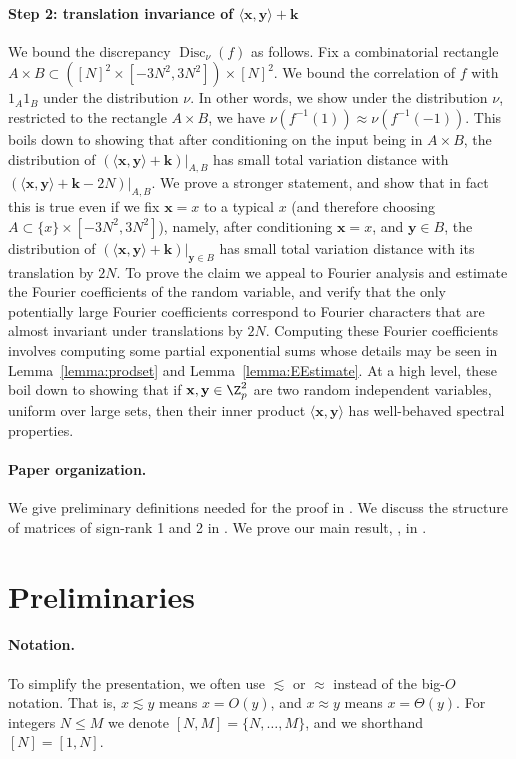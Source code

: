 \documentclass{toc}
\DeclareMathOperator{\Disc}{Disc}
\newcommand{\x}{\mathbf{x}}
\newcommand{\y}{\mathbf{y}}
\newcommand{\Bk}{\mathbf{k}}   %
\newcommand{\ip}[1]{\langle #1 \rangle}
\begin{document}
\paragraph{Step 2: translation invariance of $\langle \x,\y\rangle+\Bk$}
We bound the discrepancy $\Disc_\nu(f)$ as follows. Fix a combinatorial rectangle $A\times B\subset ([N]^2\times [-3N^2,3N^2]) \times [N]^2$. We bound the correlation of $f$ with $1_A1_B$ under the distribution $\nu$. In other words, we show under the distribution $\nu$, restricted to the rectangle $A\times B$, we have $\nu(f^{-1}(1)) \approx \nu(f^{-1}(-1)) $.  This boils down to showing that after conditioning on the input being in $A\times B$, the distribution of $(\ip{\x,\y}+\Bk)|_{A,B}$ has small total variation distance with $(\ip{\x,\y}+\Bk-2N)|_{A,B}$. We prove a stronger  statement, and show that in fact this is true even if we fix $\x=x$ to a typical $x$ (and therefore choosing $A\subset \{x\}\times [-3N^2,3N^2]$), namely, after conditioning $\x=x$, and $\y\in B$, the distribution of $(\ip{\x,\y}+\Bk)|_{\y \in B}$  has small total variation distance with its translation by $2N$. To prove the claim  we appeal to  Fourier analysis and estimate the Fourier coefficients of the random variable, and verify that  the only potentially large Fourier coefficients correspond to Fourier characters that are almost invariant under translations by $2N$. Computing these Fourier coefficients involves computing some partial exponential sums whose details may be seen in Lemma~\ref{lemma:prodset} and Lemma~\ref{lemma:EEstimate}. At a high level, these boil down to showing that if $\x,\y \in \Z_p^2$ are two random independent variables, uniform over large sets, then their inner product $\ip{\x,\y}$ has well-behaved spectral properties.


\paragraph{Paper organization.}
We give preliminary definitions needed for the proof in .
We discuss the structure of matrices of sign-rank 1 and 2 in .
We prove our main result, , in .


\section{Preliminaries}
\label{sec:prelim}

%
\paragraph{Notation.}   %
To simplify the presentation, we often use $\lesssim$ or $\approx$ instead of the big-$O$ notation. That is, $x \lesssim y$ means $x=O(y)$, and $x \approx y$ means $x = \Theta(y)$. For integers $N \le M$ we denote $[N,M]=\{N,\ldots,M\}$, and we shorthand $[N]=[1,N]$.
\end{document}

